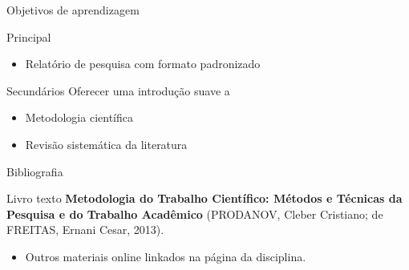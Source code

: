 \documentclass{beamer}
\begin{document}
\begin{frame}[label=objetivo]{Objetivos de aprendizagem}
  \begin{block}{Principal}
    \begin{itemize}
      \large
    \item Relatório de pesquisa com formato padronizado
    \end{itemize}
  \end{block}
  \bigskip
  \bigskip
  \begin{block}{Secundários}
    \small
    Oferecer uma introdução suave a
    \begin{itemize}
    \item Metodologia científica
    \item Revisão sistemática da literatura
    \end{itemize}
  \end{block}
\end{frame}

\begin{frame}{Bibliografia}
  \begin{block}{Livro texto}
    {\bf Metodologia do Trabalho Científico: Métodos e Técnicas da Pesquisa e do Trabalho Acadêmico} (PRODANOV, Cleber Cristiano; de FREITAS, Ernani Cesar, 2013).
  \end{block}
  \begin{itemize}
  \item Outros materiais online linkados na página da disciplina.
  \end{itemize}
\end{frame}
\end{document}
